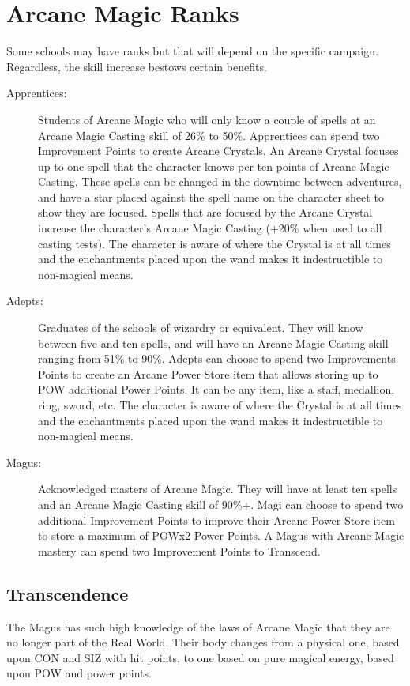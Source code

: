 \section{Arcane Magic Ranks}
Some schools may have ranks but that will depend on the specific campaign. Regardless, the skill increase bestows certain benefits.
\begin{description}
\item[Apprentices:] Students of Arcane Magic who will only know a couple of spells at an Arcane Magic Casting skill of 26\% to 50\%. Apprentices can spend two Improvement Points to create Arcane Crystals. An Arcane Crystal focuses up to one spell that the character knows per ten points of Arcane Magic Casting. These spells can be changed in the downtime between adventures, and have a star placed against the spell name on the character sheet to show they are focused. Spells that are focused by the Arcane Crystal increase the character’s Arcane Magic Casting (+20\% when used to all casting tests). The character is aware of where the Crystal is at all times and the enchantments placed upon the wand makes it indestructible to non-magical means.

\item[Adepts:] Graduates of the schools of wizardry or equivalent. They will know between five and ten spells, and will have an Arcane Magic Casting skill ranging from 51\% to 90\%. Adepts can choose to spend two Improvements Points to create an Arcane Power Store item that allows storing up to POW additional Power Points. It can be any item, like a staff, medallion, ring, sword, etc. The character is aware of where the Crystal is at all times and the enchantments placed upon the wand makes it indestructible to non-magical means.

\item[Magus:] Acknowledged masters of Arcane Magic. They will have at least ten spells and an Arcane Magic Casting skill of 90\%+. Magi can choose to spend two additional Improvement Points to improve their Arcane Power Store item to store a maximum of POWx2 Power Points. A Magus with Arcane Magic mastery can spend two Improvement Points to Transcend.
\end{description}

\subsection{Transcendence}
The Magus has such high knowledge of the laws of Arcane Magic that they are no longer part of the Real World. Their body changes from a physical one, based upon CON and SIZ with hit points, to one based on pure magical energy, based upon POW and power points.

